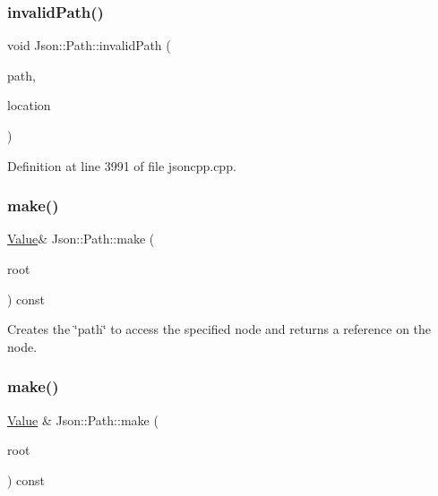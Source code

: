 \hypertarget{class_json_1_1_path_a0fa77fc0cefefcfcf2f1242c79009dd9}{}\label{class_json_1_1_path_a0fa77fc0cefefcfcf2f1242c79009dd9} 
\subsubsection{\texorpdfstring{invalid\+Path()}{invalidPath()}\hspace{0.1cm}{\footnotesize\ttfamily [2/2]}}
{\footnotesize\ttfamily void Json\+::\+Path\+::invalid\+Path (\begin{DoxyParamCaption}\item[{const \hyperlink{config_8h_a1e723f95759de062585bc4a8fd3fa4be}{J\+S\+O\+N\+C\+P\+P\+\_\+\+S\+T\+R\+I\+NG} \&}]{path,  }\item[{int}]{location }\end{DoxyParamCaption})\hspace{0.3cm}{\ttfamily [private]}}



Definition at line 3991 of file jsoncpp.\+cpp.

\hypertarget{class_json_1_1_path_ad32b95567b035727b39e0a3b0a675d3f}{}\label{class_json_1_1_path_ad32b95567b035727b39e0a3b0a675d3f} 
\subsubsection{\texorpdfstring{make()}{make()}\hspace{0.1cm}{\footnotesize\ttfamily [1/2]}}
{\footnotesize\ttfamily \hyperlink{class_json_1_1_value}{Value}\& Json\+::\+Path\+::make (\begin{DoxyParamCaption}\item[{\hyperlink{class_json_1_1_value}{Value} \&}]{root }\end{DoxyParamCaption}) const}

Creates the \char`\"{}path\char`\"{} to access the specified node and returns a reference on the node. \hypertarget{class_json_1_1_path_a858f9426f0f7bbe0450644d72b44e26b}{}\label{class_json_1_1_path_a858f9426f0f7bbe0450644d72b44e26b} 
\subsubsection{\texorpdfstring{make()}{make()}\hspace{0.1cm}{\footnotesize\ttfamily [2/2]}}
{\footnotesize\ttfamily \hyperlink{class_json_1_1_value}{Value} \& Json\+::\+Path\+::make (\begin{DoxyParamCaption}\item[{\hyperlink{class_json_1_1_value}{Value} \&}]{root }\end{DoxyParamCaption}) const}

